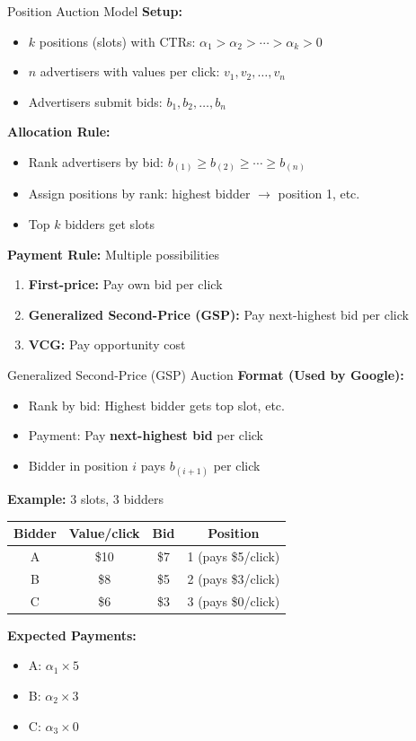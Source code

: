 \documentclass[xcolor={x11names}, aspectratio=169 ]{beamer}
\begin{document}
\begin{frame}{Position Auction Model}
\textbf{Setup:}
\begin{itemize}
  \item $k$ positions (slots) with CTRs: $\alpha_1 > \alpha_2 > \cdots > \alpha_k > 0$
  \item $n$ advertisers with values per click: $v_1, v_2, \ldots, v_n$
  \item Advertisers submit bids: $b_1, b_2, \ldots, b_n$
\end{itemize}

\textbf{Allocation Rule:}
\begin{itemize}
  \item Rank advertisers by bid: $b_{(1)} \geq b_{(2)} \geq \cdots \geq b_{(n)}$
  \item Assign positions by rank: highest bidder $\rightarrow$ position 1, etc.
  \item Top $k$ bidders get slots
\end{itemize}

\textbf{Payment Rule:} Multiple possibilities
\begin{enumerate}
  \item \textbf{First-price:} Pay own bid per click
  \item \textbf{Generalized Second-Price (GSP):} Pay next-highest bid per click
  \item \textbf{VCG:} Pay opportunity cost
\end{enumerate}
\end{frame}

\begin{frame}{Generalized Second-Price (GSP) Auction}
\textbf{Format (Used by Google):}
\begin{itemize}
  \item Rank by bid: Highest bidder gets top slot, etc.
  \item Payment: Pay \textbf{next-highest bid} per click
  \item Bidder in position $i$ pays $b_{(i+1)}$ per click
\end{itemize}

\textbf{Example:} 3 slots, 3 bidders
\begin{center}
\begin{tabular}{cccc}
\toprule
Bidder & Value/click & Bid & Position \\
\midrule
A & \$10 & \$7 & 1 (pays \$5/click) \\
B & \$8 & \$5 & 2 (pays \$3/click) \\
C & \$6 & \$3 & 3 (pays \$0/click) \\
\bottomrule
\end{tabular}
\end{center}

\textbf{Expected Payments:}
\begin{itemize}
  \item A: $\alpha_1 \times 5$
  \item B: $\alpha_2 \times 3$
  \item C: $\alpha_3 \times 0$
\end{itemize}
\end{frame}
\end{document}
